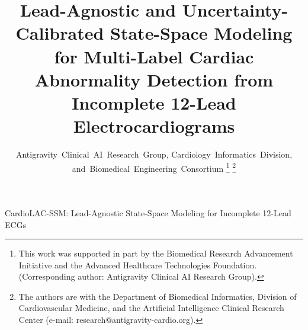 \documentclass[journal]{IEEEtran}
\begin{document}
\title{Lead-Agnostic and Uncertainty-Calibrated State-Space Modeling for Multi-Label Cardiac Abnormality Detection from Incomplete 12-Lead Electrocardiograms}

\author{Antigravity~Clinical~AI~Research~Group,
        Cardiology~Informatics~Division,
        and~Biomedical~Engineering~Consortium%
\thanks{This work was supported in part by the Biomedical Research Advancement Initiative and the Advanced Healthcare Technologies Foundation. (Corresponding author: Antigravity Clinical AI Research Group).}%
\thanks{The authors are with the Department of Biomedical Informatics, Division of Cardiovascular Medicine, and the Artificial Intelligence Clinical Research Center (e-mail: research@antigravity-cardio.org).}}

%
{CardioLAC-SSM: Lead-Agnostic State-Space Modeling for Incomplete 12-Lead ECGs}

\maketitle
\end{document}
